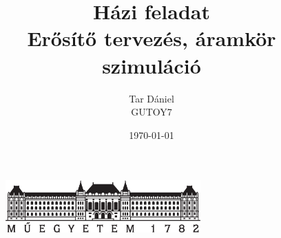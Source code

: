 \documentclass{article}
\begin{document}
	
	\begin{titlepage}
		\setlength{\headheight}{20pt}
		\title{\huge Házi feladat\\
			\Large Erősítő tervezés, áramkör szimuláció}
		\author{Tar Dániel\\GUTOY7}
		\date{\today}
		\maketitle
		\thispagestyle{fancy}
		
		\begin{figure}
			\begin{center}
				\includegraphics[height=2cm]{logo_bme_kicsi.eps}
			\end{center}
		\end{figure}
		
	\end{titlepage}
	\newpage
	
	
	
\end{document}
